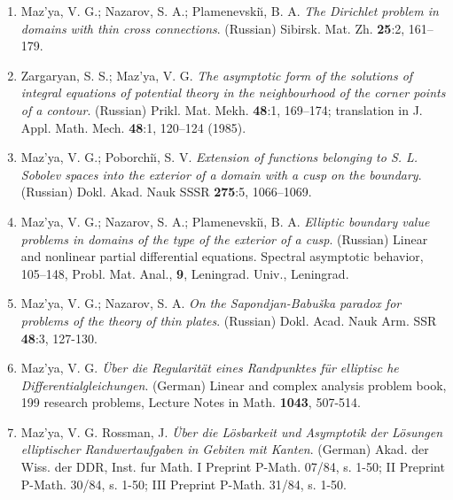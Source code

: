 \documentclass{article}
\begin{document}
\begin{enumerate}
\item Maz'ya, V. G.; Nazarov, S. A.; Plamenevski{\u\i}, B. A. {\it The
Dirichlet problem in domains with thin
cross connections}. (Russian) Sibirsk. Mat. Zh. {\bf 25}:2, 161--179.
\item Zargaryan, S. S.; Maz'ya, V. G. {\it The asymptotic form of the
solutions of integral equations of potential
theory in the neighbourhood of the corner points of a contour}.
(Russian)
Prikl. Mat. Mekh. {\bf 48}:1, 169--174; translation in J.
Appl. Math. Mech. {\bf 48}:1, 120--124 (1985).

\item Maz'ya, V. G.; Poborchi{\u\i}, S. V. {\it Extension of functions
belonging to S. L. Sobolev spaces into the exterior of a domain with a
cusp
on the boundary}. (Russian) Dokl. Akad. Nauk SSSR {\bf 275}:5,
1066--1069.


\item Maz'ya, V. G.; Nazarov, S. A.; Plamenevski{\u\i}, B. A. {\it
Elliptic
boundary value problems in domains of the type of the
exterior of a cusp}. (Russian) Linear and nonlinear partial
differential
equations. Spectral asymptotic behavior, 105--148, Probl.
Mat. Anal., {\bf 9}, Leningrad. Univ., Leningrad.
\item Maz'ya, V. G.; Nazarov, S. A. {\it On the Sapondjan-Babu\v ska
paradox for problems of the theory of thin plates}.
(Russian) Dokl. Acad. Nauk Arm. SSR {\bf 48}:3, 127-130.
\item Maz'ya, V. G. {\it \"Uber die Regularit\"at eines Randpunktes
f\"ur
elliptisc he Differentialgleichungen}. (German) Linear and
complex analysis problem book, 199 research problems, Lecture Notes in
Math. {\bf 1043}, 507-514.
\item Maz'ya, V. G. Rossman, J. {\it \"Uber die L\"osbarkeit und
Asymptotik
der L\"osungen elliptischer Randwertaufgaben in Gebiten
mit Kanten}. (German) Akad. der Wiss. der DDR, Inst. fur Math. I
Preprint
P-Math. 07/84, s. 1-50; II Preprint P-Math. 30/84, s.
1-50; III Preprint P-Math. 31/84, s. 1-50.\hfill\break


\end{enumerate}
\end{document}
